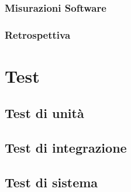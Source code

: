 \documentclass[a4paper, oneside, openany, dvipsnames, table]{article}
\begin{document}
		\subsubsection{Misurazioni Software}
			
		\subsubsection{Retrospettiva}
			

\newpage
\section{Test}


\subsection{Test di unità}
	
\subsection{Test di integrazione}
	
\subsection{Test di sistema}
	
	
% 		
% 		
\end{document}
